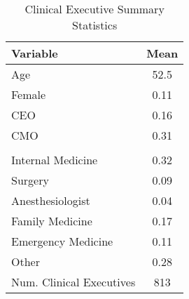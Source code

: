 \begin{table}[ht!]
\centering
\caption{\label{doc_sumstats}Clinical Executive Summary Statistics}
\centering
\begin{tabular}[t]{p{6cm} c}
\toprule
Variable & Mean\\
\midrule
Age & 52.5\\
Female & 0.11\\
CEO & 0.16\\
CMO & 0.31\\
\addlinespace[0.3em]
\multicolumn{2}{l}{\textbf{Specialty}}\\
\hspace{1em}Internal Medicine & 0.32\\
\hspace{1em}Surgery & 0.09\\
\hspace{1em}Anesthesiologist & 0.04\\
\hspace{1em}Family Medicine & 0.17\\
\hspace{1em}Emergency Medicine & 0.11\\
\hspace{1em}Other & 0.28\\
\addlinespace[0.3em]
Num. Clinical Executives & 813\\
\bottomrule
\end{tabular}
\end{table}

